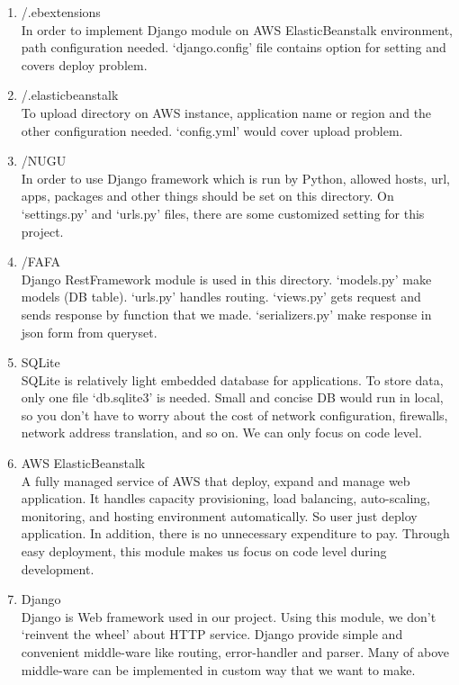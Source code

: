 \documentclass[conference]{IEEEtran}
\begin{document}
\begin{enumerate}
    \item /.ebextensions\\
    In order to implement Django module on AWS ElasticBeanstalk environment, path configuration needed. ‘django.config’ file contains option for setting and covers deploy problem.\\
    \item /.elasticbeanstalk\\
    To upload directory on AWS instance, application name or region and the other configuration needed. ‘config.yml’ would cover upload problem.\\
    \item /NUGU\\
    In order to use Django framework which is run by Python, allowed hosts, url, apps, packages and other things should be set on this directory. On ‘settings.py’ and ‘urls.py’ files, there are some customized setting for this project.\\
    \item /FAFA\\
    Django RestFramework module is used in this directory. ‘models.py’ make models (DB table). ‘urls.py’ handles routing. ‘views.py’ gets request and sends response by function that we made. ‘serializers.py’ make response in json form from queryset.\\
    \item SQLite \\
    SQLite is relatively light embedded database for applications. To store data, only one file ‘db.sqlite3’ is needed. Small and concise DB would run in local, so you don’t have to worry about the cost of network configuration, firewalls, network address translation, and so on. We can only focus on code level.\\
    \item AWS ElasticBeanstalk\\
    A fully managed service of AWS that deploy, expand and manage web application. It handles capacity provisioning, load balancing, auto-scaling, monitoring, and hosting environment automatically. So user just deploy application. In addition, there is no unnecessary expenditure to pay. Through easy deployment, this module makes us focus on code level during development. \\
    \item Django\\
    Django is Web framework used in our project. Using this module, we don’t ‘reinvent the wheel’ about HTTP service. Django provide simple and convenient middle-ware like routing, error-handler and parser. Many of above middle-ware can be implemented in custom way that we want to make.\\

\end{enumerate}
\end{document}

